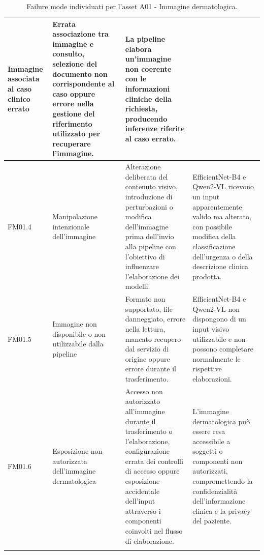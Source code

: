 {\begin{xltabular}{\textwidth}{
    >{\raggedright\arraybackslash}p{1.1cm}
    >{\raggedright\arraybackslash}p{3cm}
    >{\raggedright\arraybackslash}p{5cm}
    X
}
Immagine associata al caso clinico errato &

Errata associazione tra immagine e consulto, selezione del
documento non corrispondente al caso oppure errore nella gestione
del riferimento utilizzato per recuperare l'immagine. &

La pipeline elabora un'immagine non coerente con le informazioni
cliniche della richiesta, producendo inferenze riferite al caso
errato. \\

\midrule

FM01.4 \hypertarget{fm01-4}{} &

Manipolazione intenzionale dell'immagine &

Alterazione deliberata del contenuto visivo, introduzione di
perturbazioni o modifica dell'immagine prima dell'invio alla
pipeline con l'obiettivo di influenzare l'elaborazione dei modelli. &

EfficientNet-B4 e Qwen2-VL ricevono un input apparentemente valido
ma alterato, con possibile modifica della classificazione
dell'urgenza o della descrizione clinica prodotta. \\

\midrule


FM01.5 &

Immagine non disponibile o non utilizzabile dalla pipeline &

Formato non supportato, file danneggiato, errore nella lettura,
mancato recupero dal servizio di origine oppure errore durante
il trasferimento. &

EfficientNet-B4 e Qwen2-VL non dispongono di un input visivo
utilizzabile e non possono completare normalmente le rispettive
elaborazioni. \\

\midrule


FM01.6 \hypertarget{fm01-6}{} &

Esposizione non autorizzata dell'immagine dermatologica &

Accesso non autorizzato all'immagine durante il trasferimento o
l'elaborazione, configurazione errata dei controlli di accesso oppure
esposizione accidentale dell'input attraverso i componenti coinvolti
nel flusso di elaborazione. &

L'immagine dermatologica può essere resa accessibile a soggetti o
componenti non autorizzati, compromettendo la confidenzialità
dell'informazione clinica e la privacy del paziente. \\

\bottomrule

\caption{Failure mode individuati per l'asset A01 - Immagine dermatologica.}

\label{tab:a01-failure-modes}\\

\end{xltabular}
}


